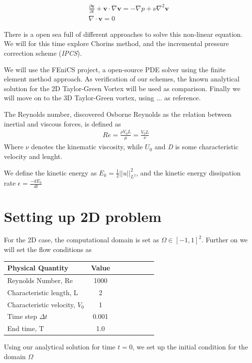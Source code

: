 \documentclass[a4paper,norsk]{article}
\begin{document}
\begin{align}
&\frac{\partial \textbf{v}}{\partial t} + \textbf{v} \cdot \nabla \textbf{v} =
-\nabla p + \nu \nabla^2 \textbf{v} \\
&\nabla \cdot \textbf{v} = 0
\end{align}

There is a open sea full of different approaches to solve this non-linear equation. We will for this
time explore Chorins method, and the incremental pressure correction scheme (\textit{IPCS}).

We will use the FEniCS project, a open-source PDE solver using the finite element method approach.
As verification of our schemes, the known analytical solution for the 2D Taylor-Green Vortex will be used as comparison.
Finally we will move on to the 3D Taylor-Green vortex, using ... as reference.

The Reynolds number, discovered Osborne Reynolds as the relation between inertial and viscous forces, is defined
as
\begin{align}
Re = \frac{\rho V_{0} L}{\mu} = \frac{V_{0} L}{\nu}
\end{align}
Where $\nu$ denotes the kinematic viscosity, while $U_{0}$ and \textit{D} is some characteristic velocity and lenght.

We define the kinetic energy as $E_k = \frac{1}{2}||u||^2_{L^2}$, and the kinetic energy dissipation rate $\epsilon = \frac{-d E_k}{dt}$

\section*{Setting up 2D problem}

For the 2D case, the computational domain is set as $\Omega \in [-1, 1]^2$. Further on we will set
the flow conditions as \\

\begin{tabular}{l*{6}{c}r}
Physical Quantity              & Value  \\
\hline
Reynolds Number, Re & 1000   \\
Characteristic length, L           & 2     \\
Characteristic velocity, $V_{0}$   & 1     \\
Time step $\Delta t$ 			   & 0.001 \\
End time, T 					   & 1.0
\end{tabular}

Using our analytical solution for time $t = 0$, we set up the initial condition
for the domain $\Omega$
\end{document}
